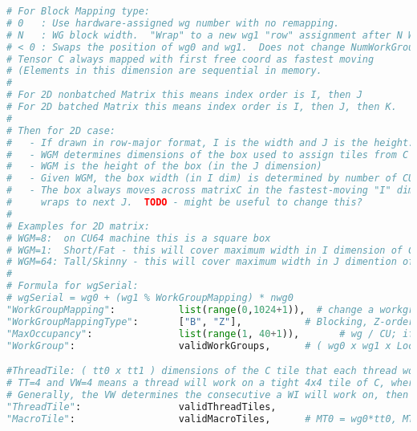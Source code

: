 \documentclass[]{article}
\begin{document}
\begin{lstlisting}[language=python,breaklines=true]
# For Block Mapping type:
# 0   : Use hardware-assigned wg number with no remapping.
# N   : WG block width.  "Wrap" to a new wg1 "row" assignment after N WGs assigned in that row.
# < 0 : Swaps the position of wg0 and wg1.  Does not change NumWorkGroups* or ProblemNumWorkGroups*. No longer supported.
# Tensor C always mapped with first free coord as fastest moving
# (Elements in this dimension are sequential in memory.
#
# For 2D nonbatched Matrix this means index order is I, then J
# For 2D batched Matrix this means index order is I, then J, then K.
#
# Then for 2D case:
#   - If drawn in row-major format, I is the width and J is the height.
#   - WGM determines dimensions of the box used to assign tiles from C
#   - WGM is the height of the box (in the J dimension)
#   - Given WGM, the box width (in I dim) is determined by number of CUs
#   - The box always moves across matrixC in the fastest-moving "I" dim, then
#     wraps to next J.  TODO - might be useful to change this?
#
# Examples for 2D matrix:
# WGM=8:  on CU64 machine this is a square box
# WGM=1:  Short/Fat - this will cover maximum width in I dimension of C.  This matches hardware assigned mapping.
# WGM=64: Tall/Skinny - this will cover maximum width in J dimention of C.
#
# Formula for wgSerial:
# wgSerial = wg0 + (wg1 % WorkGroupMapping) * nwg0
"WorkGroupMapping":           list(range(0,1024+1)),  # change a workgroup's id so that the all the workgroups on the gpu at a time are hitting L2 cache the best
"WorkGroupMappingType":       ["B", "Z"],           # Blocking, Z-order (not any faster than blocking, especially for the arithmetic it requires)
"MaxOccupancy":               list(range(1, 40+1)),       # wg / CU; if cache thrashing is hurting performance, this allocates extra lds to artificially limit occupancy
"WorkGroup":                  validWorkGroups,      # ( wg0 x wg1 x LocalSplitU ) dimensions of the workgroup which will operate on a tile and share lds

#ThreadTile: ( tt0 x tt1 ) dimensions of the C tile that each thread works on,
# TT=4 and VW=4 means a thread will work on a tight 4x4 tile of C, where VW=1 means the tile will work on 16 spread out values
# Generally, the VW determines the consecutive a WI will work on, then it will skip ahead SG0*VW elements to get to the next row of VGPR inputs
"ThreadTile":                 validThreadTiles,
"MacroTile":                  validMacroTiles,      # MT0 = wg0*tt0, MT1 = wg1*tt1


\end{lstlisting}
\end{document}

